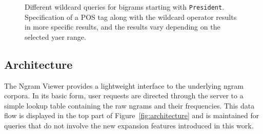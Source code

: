 \documentclass[11pt,a4paper]{article}
\newcommand{\query}[1]{\texttt{#1}}
\begin{document}
\begin{figure}[!t]
\vspace{-0.1in}
\centering
\addtolength{\subfigcapskip}{-0.2cm}
\hspace*{-0.5cm}
\caption{\label{fig:presidents}
Different wildcard queries for bigrams starting with \query{President}. Specification of a POS tag along with the wildcard operator results in more
specific results, and the results vary depending on the selected yaer range.}
\vspace{-0.1in}
\end{figure}


\subsection{Architecture}
The Ngram Viewer provides a lightweight interface to the underlying ngram corpora. In its basic form, user requests are directed through the server to a simple lookup table containing the raw ngrams and their frequencies. This data flow is displayed in the top part of Figure~\ref{fig:architecture} and is maintained for queries that do not involve the new expansion features introduced in this work.
\end{document}

